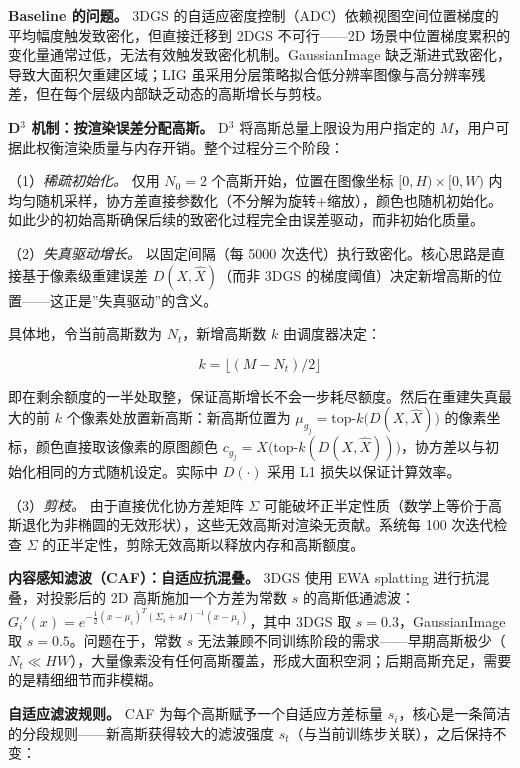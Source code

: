 \textbf{Baseline 的问题。} 3DGS 的自适应密度控制（ADC）依赖视图空间位置梯度的平均幅度触发致密化，但直接迁移到 2DGS 不可行——2D 场景中位置梯度累积的变化量通常过低，无法有效触发致密化机制。GaussianImage 缺乏渐进式致密化，导致大面积欠重建区域；LIG 虽采用分层策略拟合低分辨率图像与高分辨率残差，但在每个层级内部缺乏动态的高斯增长与剪枝。

\textbf{D$^3$ 机制：按渲染误差分配高斯。} D$^3$ 将高斯总量上限设为用户指定的 $M$，用户可据此权衡渲染质量与内存开销。整个过程分三个阶段：

（1）\textit{稀疏初始化。} 仅用 $N_0 = 2$ 个高斯开始，位置在图像坐标 $[0, H) \times [0, W)$ 内均匀随机采样，协方差直接参数化（不分解为旋转+缩放），颜色也随机初始化。如此少的初始高斯确保后续的致密化过程完全由误差驱动，而非初始化质量。

（2）\textit{失真驱动增长。} 以固定间隔（每 5000 次迭代）执行致密化。核心思路是直接基于像素级重建误差 $D(X, \hat{X})$（而非 3DGS 的梯度阈值）决定新增高斯的位置——这正是”失真驱动”的含义。

具体地，令当前高斯数为 $N_t$，新增高斯数 $k$ 由调度器决定：

\begin{equation}
k = \bigl\lfloor (M - N_t) / 2 \bigr\rfloor
\end{equation}

即在剩余额度的一半处取整，保证高斯增长不会一步耗尽额度。然后在重建失真最大的前 $k$ 个像素处放置新高斯：新高斯位置为 $\mu_{g_j} = \text{top-}k\bigl(D(X, \hat{X})\bigr)$ 的像素坐标，颜色直接取该像素的原图颜色 $c_{g_j} = X\bigl(\text{top-}k(D(X, \hat{X}))\bigr)$，协方差以与初始化相同的方式随机设定。实际中 $D(\cdot)$ 采用 L1 损失以保证计算效率。

（3）\textit{剪枝。} 由于直接优化协方差矩阵 $\Sigma$ 可能破坏正半定性质（数学上等价于高斯退化为非椭圆的无效形状），这些无效高斯对渲染无贡献。系统每 100 次迭代检查 $\Sigma$ 的正半定性，剪除无效高斯以释放内存和高斯额度。

\textbf{内容感知滤波（CAF）：自适应抗混叠。} 3DGS 使用 EWA splatting 进行抗混叠，对投影后的 2D 高斯施加一个方差为常数 $s$ 的高斯低通滤波：$G_i'(x) = e^{-\frac{1}{2}(x-\mu_i)^T(\Sigma_i + sI)^{-1}(x-\mu_i)}$，其中 3DGS 取 $s = 0.3$，GaussianImage 取 $s = 0.5$。问题在于，常数 $s$ 无法兼顾不同训练阶段的需求——早期高斯极少（$N_t \ll HW$），大量像素没有任何高斯覆盖，形成大面积空洞；后期高斯充足，需要的是精细细节而非模糊。

\textbf{自适应滤波规则。} CAF 为每个高斯赋予一个自适应方差标量 $s_i$，核心是一条简洁的分段规则——新高斯获得较大的滤波强度 $s_t$（与当前训练步关联），之后保持不变：

